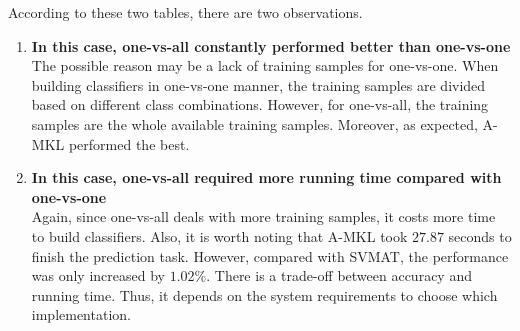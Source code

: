 \noindent According to these two tables, there are two observations. 
\begin{enumerate}
  \item{\bf In this case, one-vs-all constantly performed better than one-vs-one} \\
  The possible reason may be a lack of training samples for one-vs-one. When building classifiers in one-vs-one manner, the training samples are divided based on different class combinations. However, for one-vs-all, the training samples are the whole available training samples. Moreover, as expected, A-MKL performed the best. 

  \item{\bf In this case, one-vs-all required more running time compared with one-vs-one} \\
  Again, since one-vs-all deals with more training samples, it costs more time to build classifiers. Also, it is worth noting that A-MKL took $27.87$ seconds to finish the prediction task. However, compared with SVM\textunderscore AT, the performance was only increased by $1.02 \%$. There is a trade-off between accuracy and running time. Thus, it depends on the system requirements to choose which implementation. 

\end{enumerate}
